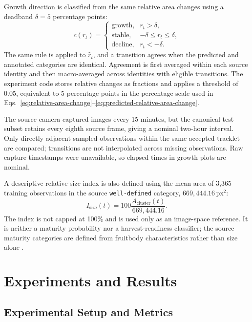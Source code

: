 \documentclass[11pt,a4paper]{article}
\begin{document}
Growth direction is classified from the same relative area changes using a deadband $\delta=5$ percentage points:
\begin{equation}
c(r_t)=
\begin{cases}
\text{growth}, & r_t>\delta,\\
\text{stable}, & -\delta\leq r_t\leq\delta,\\
\text{decline}, & r_t<-\delta.
\end{cases}
\label{eq:growth-direction-class}
\end{equation}
The same rule is applied to $\hat{r}_t$, and a transition agrees when the predicted and annotated categories are identical. Agreement is first averaged within each source identity and then macro-averaged across identities with eligible transitions. The experiment code stores relative changes as fractions and applies a threshold of $0.05$, equivalent to $5$ percentage points in the percentage scale used in Eqs.~\ref{eq:relative-area-change}--\ref{eq:predicted-relative-area-change}.

The source camera captured images every 15 minutes, but the canonical test subset retains every eighth source frame, giving a nominal two-hour interval. Only directly adjacent sampled observations within the same accepted tracklet are compared; transitions are not interpolated across missing observations. Raw capture timestamps were unavailable, so elapsed times in growth plots are nominal.

A descriptive relative-size index is also defined using the mean area of 3,365 training observations in the source \texttt{well-defined} category, $669{,}444.16\,\mathrm{px}^2$:
\begin{equation}
I_{\mathrm{size}}(t)=100\frac{A_{\mathrm{cluster}}(t)}{669{,}444.16}.
\end{equation}
The index is not capped at 100\% and is used only as an image-space reference. It is neither a maturity probability nor a harvest-readiness classifier; the source maturity categories are defined from fruitbody characteristics rather than size alone \cite{charisis}.

\section{Experiments and Results}

\subsection{Experimental Setup and Metrics}
\end{document}
